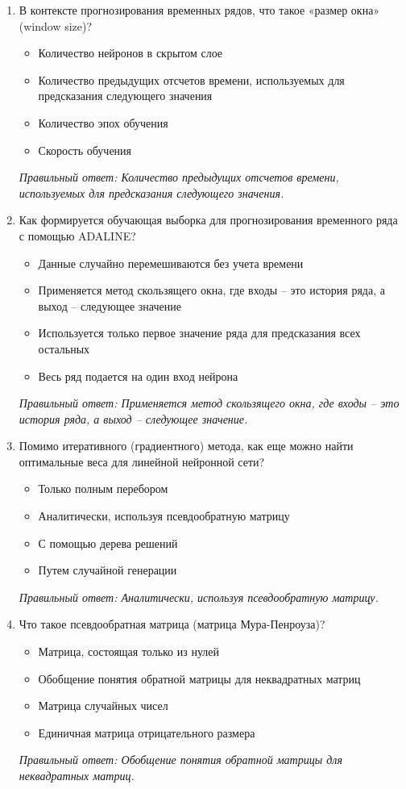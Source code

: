 \begin{enumerate}[label=\textbf{\arabic*.}, leftmargin=0pt, itemsep=1.2em]
\item В контексте прогнозирования временных рядов, что такое «размер окна» (window size)?
\begin{itemize}[label=$\square$, leftmargin=1.5cm, itemsep=0.2em, topsep=0.3em]
\item Количество нейронов в скрытом слое
\item Количество предыдущих отсчетов времени, используемых для предсказания следующего значения
\item Количество эпох обучения
\item Скорость обучения
\end{itemize}
{\small\textit{Правильный ответ: Количество предыдущих отсчетов времени, используемых для предсказания следующего значения.}}

\item Как формируется обучающая выборка для прогнозирования временного ряда с помощью ADALINE?
\begin{itemize}[label=$\square$, leftmargin=1.5cm, itemsep=0.2em, topsep=0.3em]
\item Данные случайно перемешиваются без учета времени
\item Применяется метод скользящего окна, где входы – это история ряда, а выход – следующее значение
\item Используется только первое значение ряда для предсказания всех остальных
\item Весь ряд подается на один вход нейрона
\end{itemize}
{\small\textit{Правильный ответ: Применяется метод скользящего окна, где входы – это история ряда, а выход – следующее значение.}}

\item Помимо итеративного (градиентного) метода, как еще можно найти оптимальные веса для линейной нейронной сети?
\begin{itemize}[label=$\square$, leftmargin=1.5cm, itemsep=0.2em, topsep=0.3em]
\item Только полным перебором
\item Аналитически, используя псевдообратную матрицу
\item С помощью дерева решений
\item Путем случайной генерации
\end{itemize}
{\small\textit{Правильный ответ: Аналитически, используя псевдообратную матрицу.}}

\item Что такое псевдообратная матрица (матрица Мура-Пенроуза)?
\begin{itemize}[label=$\square$, leftmargin=1.5cm, itemsep=0.2em, topsep=0.3em]
\item Матрица, состоящая только из нулей
\item Обобщение понятия обратной матрицы для неквадратных матриц
\item Матрица случайных чисел
\item Единичная матрица отрицательного размера
\end{itemize}
{\small\textit{Правильный ответ: Обобщение понятия обратной матрицы для неквадратных матриц.}}


\end{enumerate}
